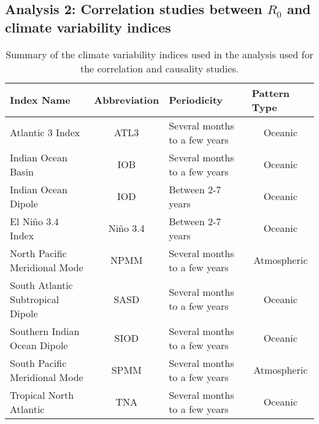 \documentclass[article,10pt,twocolumn]{wlscirep}
\begin{document}
\subsection{Analysis 2: Correlation studies between $R_0$ and climate variability indices} \label{sec-methods-2}
\begin{table*}[t]
  \centering
  \begin{tabular}{l|c|l|c}
    \textbf{Index Name}               & \multicolumn{1}{l|}{\textbf{Abbreviation}} & \textbf{Periodicity}          & \multicolumn{1}{l|}{\textbf{Pattern Type}} \\ \hline
    Atlantic 3 Index                  & ATL3                                       & Several months to a few years & Oceanic                                    \\
    Indian Ocean Basin                & IOB                                        & Several months to a few years & Oceanic                                    \\
    Indian Ocean Dipole               & IOD                                        & Between 2-7 years             & Oceanic                                    \\
    El Niño 3.4 Index                 & Niño 3.4                                   & Between 2-7 years             & Oceanic                                    \\
    North Pacific Meridional Mode     & NPMM                                       & Several months to a few years & Atmospheric                                \\
    South Atlantic Subtropical Dipole & SASD                                       & Several months to a few years & Oceanic                                    \\
    Southern Indian Ocean Dipole      & SIOD                                       & Several months to a few years & Oceanic                                    \\
    South Pacific Meridional Mode     & SPMM                                       & Several months to a few years & Atmospheric                                \\
    Tropical North Atlantic           & TNA                                        & Several months to a few years & Oceanic
  \end{tabular}%
  \caption{Summary of the climate variability indices used in the analysis used for the correlation and causality studies.}
  \label{tab:climate-variability-indices}
\end{table*}
\end{document}
